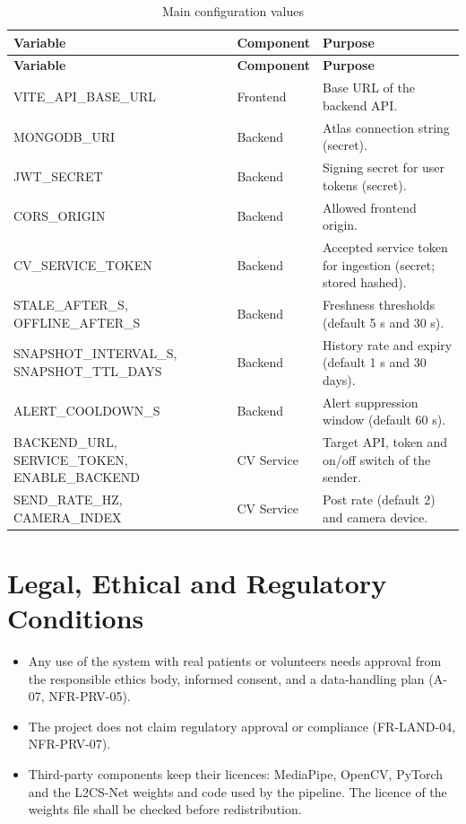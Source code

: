 \documentclass[a4paper,11pt]{scrreprt}
\begin{document}
\begin{longtable}{@{}>{\ttfamily\footnotesize}p{4.4cm}>{\raggedright\arraybackslash}p{2.6cm}>{\raggedright\arraybackslash}p{7.6cm}@{}}
\caption{Main configuration values}\\
\toprule \textbf{Variable} & \textbf{Component} & \textbf{Purpose}\\ \midrule \endfirsthead
\toprule \textbf{Variable} & \textbf{Component} & \textbf{Purpose}\\ \midrule \endhead
\bottomrule \endfoot
VITE_API_BASE_URL & Frontend & Base URL of the backend API.\\
MONGODB_URI & Backend & Atlas connection string (secret).\\
JWT_SECRET & Backend & Signing secret for user tokens (secret).\\
CORS_ORIGIN & Backend & Allowed frontend origin.\\
CV_SERVICE_TOKEN & Backend & Accepted service token for ingestion (secret; stored hashed).\\
STALE_AFTER_S, OFFLINE_AFTER_S & Backend & Freshness thresholds (default 5 s and 30 s).\\
SNAPSHOT_INTERVAL_S, SNAPSHOT_TTL_DAYS & Backend & History rate and expiry (default 1 s and 30 days).\\
ALERT_COOLDOWN_S & Backend & Alert suppression window (default 60 s).\\
BACKEND_URL, SERVICE_TOKEN, ENABLE_BACKEND & CV Service & Target API, token and on/off switch of the sender.\\
SEND_RATE_HZ, CAMERA_INDEX & CV Service & Post rate (default 2) and camera device.\\
\end{longtable}

\section{Legal, Ethical and Regulatory Conditions}
\begin{itemize}
  \item Any use of the system with real patients or volunteers needs approval from the responsible ethics body, informed consent, and a data-handling plan (A-07, NFR-PRV-05).
  \item The project does not claim regulatory approval or compliance (FR-LAND-04, NFR-PRV-07).
  \item Third-party components keep their licences: MediaPipe, OpenCV, PyTorch and the L2CS-Net weights and code used by the pipeline. The licence of the weights file shall be checked before redistribution.
\end{itemize}
\end{document}
